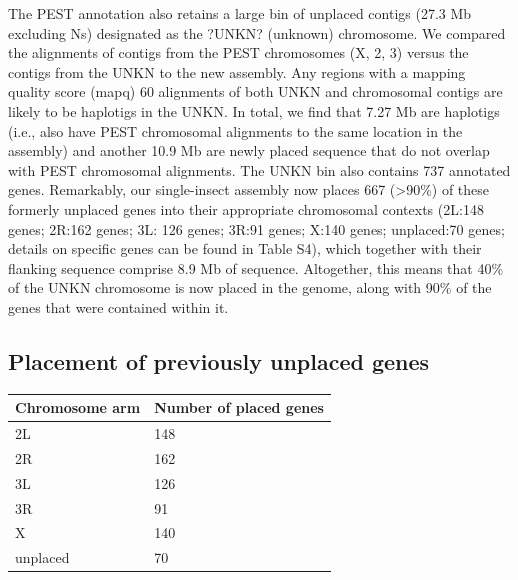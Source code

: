 The PEST annotation also retains a large bin of unplaced contigs (27.3 Mb excluding Ns) designated as the ?UNKN? (unknown) chromosome. We compared the alignments of contigs from the PEST chromosomes (X, 2, 3) versus the contigs from the UNKN to the new assembly. Any regions with a mapping quality score (mapq) 60 alignments of both UNKN and chromosomal contigs are likely to be haplotigs in the UNKN. In total, we find that 7.27 Mb are haplotigs (i.e., also have PEST chromosomal alignments to the same location in the assembly) and another 10.9 Mb are newly placed sequence that do not overlap with PEST chromosomal alignments. The UNKN bin also contains 737 annotated genes. Remarkably, our single-insect assembly now places 667 (>90\%) of these formerly unplaced genes into their appropriate chromosomal contexts (2L:148 genes; 2R:162 genes; 3L: 126 genes; 3R:91 genes; X:140 genes; unplaced:70 genes; details on specific genes can be found in Table S4), which together with their flanking sequence comprise 8.9 Mb of sequence. Altogether, this means that 40\% of the UNKN chromosome is now placed in the genome, along with 90\% of the genes that were contained within it.

\begin{table}[!ht]
\subsection{Placement of previously unplaced genes}
\label{table:unplaced}
\begin{tabular}{ | l | l |}
\hline
 Chromosome arm & Number of placed genes  \\
 
 \hline
 2L & 148 \\
 \hline
 2R & 162 \\
 \hline
 3L & 126 \\
 \hline
 3R & 91 \\
 \hline
 X & 140 \\
 \hline
 unplaced & 70 \\
 \hline
\end{tabular} 
\end{table}




